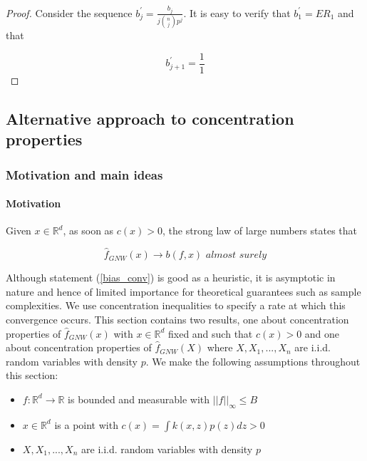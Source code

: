 \documentclass{article}
\begin{document}
\begin{proof}
Consider the sequence $b^{'}_j=\frac{b_j}{j{n\choose j}p^j}$. It is easy to verify that $b^{'}_1=ER_1$ and that 

\begin{equation*}
    b^{'}_{j+1}=\frac{1}{1}
\end{equation*}

\end{proof}

\subsection{Alternative approach to concentration properties}
\subsubsection{Motivation and main ideas}

\paragraph{Motivation}
Given $x\in\mathbb{R}^d$, as soon as $c(x)>0$, the strong law of large numbers states that 

\begin{equation}
\label{bias_conv}
    \hat{f}_{GNW}(x)\rightarrow b(f,x) \textit{ almost surely}
\end{equation}

Although  statement (\ref{bias_conv}) is good as a heuristic, it is asymptotic in nature and hence of limited importance for theoretical guarantees such as sample complexities. We use concentration inequalities to specify a rate at which this convergence occurs. This section contains two results, one about concentration properties of $\hat{f}_{GNW}(x)$ with $x\in\mathbb{R}^d$ fixed and such that $c(x)>0$ and one about concentration properties of $\hat{f}_{GNW}(X)$ where $X,X_1,...,X_n$ are i.i.d. random variables with density $p$. We make the following assumptions throughout this section:

\begin{itemize}
    \item $f\colon\mathbb{R}^d\to\mathbb{R}$ is bounded and measurable with $||f||_{\infty}\leq B$
    \item $x\in\mathbb{R}^d$ is a point with $c(x)=\int k(x,z)p(z)dz>0$
    \item $X,X_1,...,X_n$ are i.i.d. random variables with density $p$
\end{itemize}
\end{document}

